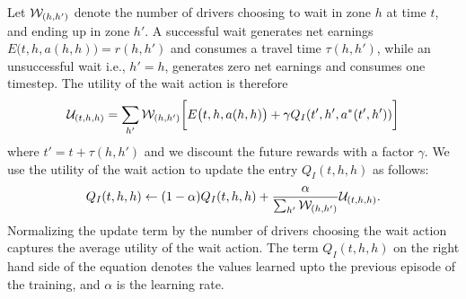 
Let ${{\mathcal{W}}}_{(h, h')}$ denote the number of drivers choosing to wait
    in zone $h$ at time $t$, and ending up in zone $h'$. 
A successful wait generates net earnings $E\big(t, h, a(h, h)\big) = r(h, h')$ 
    and consumes a travel time $\tau(h, h')$, while 
    an unsuccessful wait i.e., $h' = h$, generates zero net earnings
    and consumes one timestep.
The utility of the wait action is therefore
    \begin{equation*}
        \mathcal{U}_{(t, h,h)} = \sum_{h'} 
        {{\mathcal{W}}}_{(h, h')}
        \bigg[E\big(t, h,
            a(h,h)\big) + \gamma 
    Q_I(t', h', a^*(t', h'))\bigg]
    \end{equation*}
    where $t' = t + \tau(h, h')$ and we discount the future rewards with 
    a factor $\gamma$.
We use the utility of the wait action to update the entry $Q_I(t, h, h)$ as follows: 
    \begin{equation}
    \label{eq:Q_I_update_wait}
        Q_I(t, h, h) \leftarrow (1 - \alpha)Q_I(t, h, h) +
        \frac{\alpha}{\sum_{h'}\waitingdrivers_{(h, h')}}\mathcal{U}_{(t, h,h)}.
    \end{equation}
Normalizing the update term by the number of drivers choosing the wait action 
    captures the average utility of the wait action.
The term $Q_I(t, h, h)$ on the right hand side of the equation denotes the 
    values learned upto the previous episode of the training, and $\alpha$ is 
    the learning rate.

